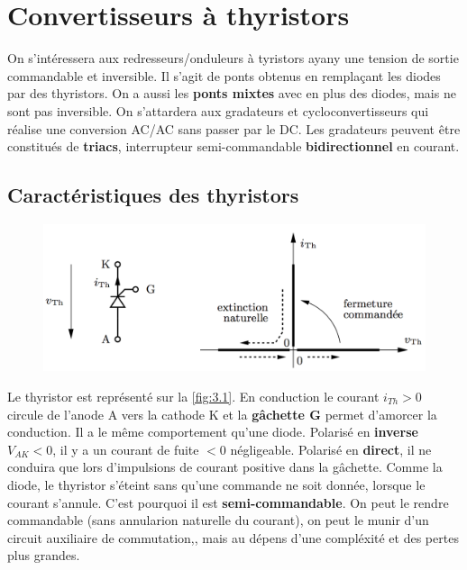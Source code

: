 
\chapter{Convertisseurs à thyristors}
	On s'intéressera aux redresseurs/onduleurs à tyristors ayany une tension de sortie commandable et inversible. Il s'agit de ponts obtenus en remplaçant les diodes par des thyristors. On a aussi les \textbf{ponts mixtes} avec en plus des diodes, mais ne sont pas inversible. On s'attardera aux gradateurs et cycloconvertisseurs qui réalise une conversion AC/AC sans passer par le DC. Les gradateurs peuvent être constitués de \textbf{triacs}, interrupteur semi-commandable \textbf{bidirectionnel} en courant. 
	
	\section{Caractéristiques des thyristors}
		\begin{figure}
		\vspace{-5mm}
		\includegraphics[scale=0.3]{ch3/1}
		\label{fig:3.1}
		\end{figure}
		Le thyristor est représenté sur la \autoref{fig:3.1}. En conduction le courant $i_{Th} > 0$ circule de l'anode A vers la cathode K et la \textbf{gâchette G} permet d'amorcer la conduction. Il a le même comportement qu'une diode. Polarisé en \textbf{inverse} $V_{AK}<0$, il y a un courant de fuite $<0$ négligeable. Polarisé en \textbf{direct}, il ne conduira que lors d'impulsions de courant positive dans la gâchette. Comme la diode, le thyristor s'éteint sans qu'une commande ne soit donnée, lorsque le courant s'annule. C'est pourquoi il est \textbf{semi-commandable}. On peut le rendre commandable (sans annularion naturelle du courant), on peut le munir d'un circuit auxiliaire de commutation,, mais au dépens d'une compléxité et des pertes plus grandes. \\
		
